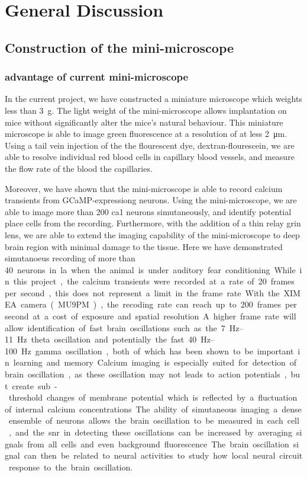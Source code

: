 \chapter{General Discussion}
\section{Construction of the mini-microscope}
\subsection{advantage of current mini-microscope}
In the current project, we have constructed a miniature microscope which weights less than \SI{3}{\gram}. The light weight of the mini-microscope allows implantation on mice without significantly alter the mice's natural behaviour.  This miniature microscope is able to image green fluorescence at a resolution of at less \SI{2}{\um}. Using a tail vein injection of the the flourescent dye, dextran-flourescein, we are able to resolve individual red blood cells in capillary blood vessels, and measure the flow rate of the blood the capillaries. 

Moreover, we have shown that the mini-microscope is able to record calcium transients from GCaMP-expressiong neurons. Using the mini-microscope, we are able to image more than \num{200} \gls{ca1} neurons simutaneously, and identify potential place cells from the recording. Furthermore, with the addition of a thin relay \gls{grin} lens, we are able to extend the imaging capability of the mini-microscope to deep brain region with minimal damage to the tissue. Here we have demonstrated simutanoeus recording of more than \SI{40} neurons in \gls{la} when the animal is under auditory fear conditioning. 

While in this project, the calcium transients were recorded at a rate of \num{20} frames per second, this does not represent a limit in the frame rate. With the XIMEA camera (MU9PM), the recoding rate can reach up to \num{200} frames per second at a cost of exposure and spatial resolution. A higher frame rate will allow identification of fast brain oscillations such as the \SIrange{7}{11}{\hertz} theta oscillation and potentially the fast \SIrange{40}{100}{\hertz} gamma oscillation, both of which has been shown to be important in learning and memory. Calcium imaging is especially suited for detection of brain oscillation, as these oscillation may not leads to action potentials, but create sub-threshold changes of membrane potential which is reflected by a fluctuation of internal calcium concentrations. The ability of simutaneous imaging a dense ensemble of neurons allows the brain oscillation to be measured in each cell, and the \gls{snr} in detecting these oscillations can be increased by averaging signals from all cells and even background fluorescence. The brain oscillation signal can then be related to neural activities to study how local neural circuit response to the brain oscillation. 

